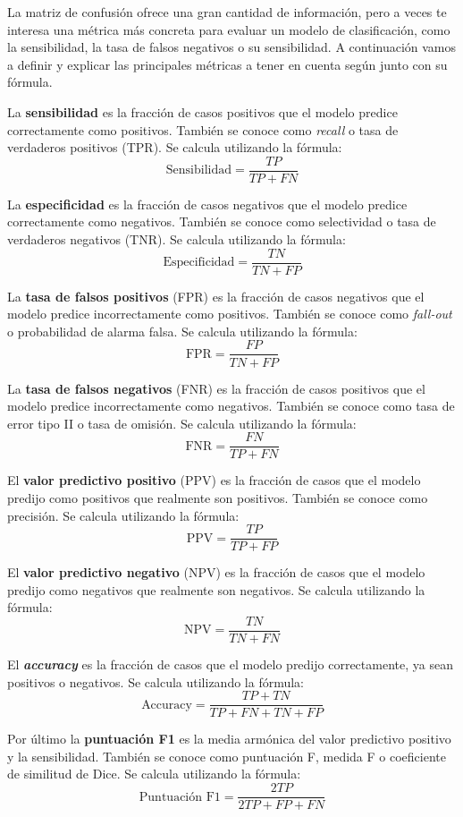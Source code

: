La matriz de confusión ofrece una gran cantidad de información, pero a veces te interesa una métrica más concreta para evaluar un modelo de clasificación, como la sensibilidad, la tasa de falsos negativos o su sensibilidad. A continuación vamos a definir y explicar las principales métricas a tener en cuenta según \citep{erickson2021magician} junto con su fórmula. 

La \textbf{sensibilidad} es la fracción de casos positivos que el modelo predice correctamente como positivos. También se conoce como \textit{recall} o tasa de verdaderos positivos (TPR). Se calcula utilizando la fórmula:
\[
\text{Sensibilidad} = \frac{TP}{TP + FN}
\]

La \textbf{especificidad} es la fracción de casos negativos que el modelo predice correctamente como negativos. También se conoce como selectividad o tasa de verdaderos negativos (TNR). Se calcula utilizando la fórmula:
\[
\text{Especificidad} = \frac{TN}{TN + FP}
\]

La \textbf{tasa de falsos positivos} (FPR) es la fracción de casos negativos que el modelo predice incorrectamente como positivos. También se conoce como \textit{fall-out} o probabilidad de alarma falsa. Se calcula utilizando la fórmula:
\[
\text{FPR} = \frac{FP}{TN + FP}
\]

La \textbf{tasa de falsos negativos} (FNR) es la fracción de casos positivos que el modelo predice incorrectamente como negativos. También se conoce como tasa de error tipo II o tasa de omisión. Se calcula utilizando la fórmula:
\[
\text{FNR} = \frac{FN}{TP + FN}
\]

El \textbf{valor predictivo positivo} (PPV) es la fracción de casos que el modelo predijo como positivos que realmente son positivos. También se conoce como precisión. Se calcula utilizando la fórmula:
\[
\text{PPV} = \frac{TP}{TP + FP}
\]

El \textbf{valor predictivo negativo} (NPV) es la fracción de casos que el modelo predijo como negativos que realmente son negativos. Se calcula utilizando la fórmula:
\[
\text{NPV} = \frac{TN}{TN + FN}
\]

El \textit{\textbf{accuracy}} es la fracción de casos que el modelo predijo correctamente, ya sean positivos o negativos. Se calcula utilizando la fórmula:
\[
\text{Accuracy} = \frac{TP + TN}{TP + FN + TN + FP}
\]

Por último la \textbf{puntuación F1} es la media armónica del valor predictivo positivo y la sensibilidad. También se conoce como puntuación F, medida F o coeficiente de similitud de Dice. Se calcula utilizando la fórmula:
\[
\text{Puntuación F1} = \frac{2TP}{2TP + FP + FN}
\]

